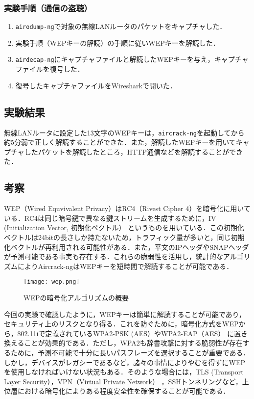 \subsubsection{実験手順（通信の盗聴）}

\begin{enumerate}
\def\labelenumi{\arabic{enumi}.}
\itemsep1pt\parskip0pt
\item
  \texttt{airodump-ng}で対象の無線LANルータのパケットをキャプチャした．
\item
  実験手順（WEPキーの解読）の手順に従いWEPキーを解読した．
\item
  \texttt{airdecap-ng}にキャプチャファイルと解読したWEPキーを与え，キャプチャファイルを復号した．
\item
  復号したキャプチャファイルをWiresharkで開いた．
\end{enumerate}

\subsection{実験結果}

無線LANルータに設定した13文字のWEPキーは，\texttt{aircrack-ng}を起動してから約5分弱で正しく解読することができた．また，解読したWEPキーを用いてキャプチャしたパケットを解読したところ，HTTP通信などを解読することができた．

\subsection{考察}

WEP（Wired Equvivalent Privacy）はRC4（Rivest Cipher
4）を暗号化に用いている．RC4は同じ暗号鍵で異なる鍵ストリームを生成するために，IV
(Initialization Vector, 初期化ベクトル）
というものを用いている．この初期化ベクトルは24bitの長さしか持たないため，トラフィック量が多いと，同じ初期化ベクトルが再利用される可能性がある．また，平文のIPヘッダやSNAPヘッダが予測可能である事実も存在する．これらの脆弱性を活用し，統計的なアルゴリズムによりAircrack-ngはWEPキーを短時間で解読することが可能である．

\begin{figure}[htbp]
    \begin{center}
        \texttt{[image: wep.png]}
    \end{center}
    \caption{WEPの暗号化アルゴリズムの概要}
\end{figure}

今回の実験で確認したように，WEPキーは簡単に解読することが可能であり，セキュリティ上のリスクとなり得る．これを防ぐために，暗号化方式をWEPから，802.11iで定義されているWPA2-PSK
(AES）やWPA2-EAP（AES）
に置き換えることが効果的である．ただし，WPA2も辞書攻撃に対する脆弱性が存在するために，予測不可能で十分に長いパスフレーズを選択することが重要である．しかし，デバイスがレガシーであるなど，諸々の事情によりやむを得ずにWEPを使用しなければいけない状況もある．そのような場合には，TLS
(Transport Layer Security），VPN（Virtual Private Network）
，SSHトンネリングなど，上位層における暗号化によりある程度安全性を確保することが可能である．
